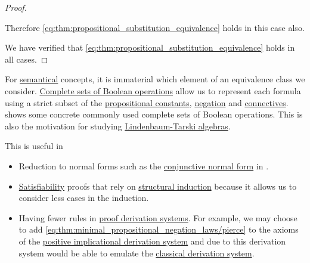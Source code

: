 \begin{proof}
\begin{itemize}
    Therefore \eqref{eq:thm:propositional_substitution_equivalence} holds in this case also.
  \end{itemize}

  We have verified that \eqref{eq:thm:propositional_substitution_equivalence} holds in all cases.
\end{proof}

\begin{remark}\label{rem:smaller_propositional_language}
  For \hyperref[def:propositional_semantics]{semantical} concepts, it is immaterial which element of an equivalence class we consider. \hyperref[def:boolean_closure]{Complete sets of Boolean operations} allow us to represent each formula using a strict subset of the \hyperref[def:propositional_language/constants]{propositional constants}, \hyperref[def:propositional_language/negation]{negation} and \hyperref[def:propositional_language/connectives]{connectives}.  shows some concrete commonly used complete sets of Boolean operations. This is also the motivation for studying \hyperref[def:lindenbaum_tarski_algebra]{Lindenbaum-Tarski algebras}.

  This is useful in
  \begin{itemize}
    \item Reduction to normal forms such as the \hyperref[def:conjunctive_disjunctive_normal_form]{conjunctive normal form} in .

    \item \hyperref[def:propositional_semantics/satisfiability]{Satisfiability} proofs that rely on \hyperref[rem:induction]{structural induction} because it allows us to consider less cases in the induction.

    \item Having fewer rules in \hyperref[alg:conjunctive_normal_form_reduction]{proof derivation systems}. For example, we may choose to add \eqref{eq:thm:minimal_propositional_negation_laws/pierce} to the axioms of the \hyperref[def:positive_implicational_propositional_derivation_system]{positive implicational derivation system} and due to  this derivation system would be able to emulate the \hyperref[def:propositional_axiomatic_derivation_system]{classical derivation system}.
  \end{itemize}
\end{remark}

